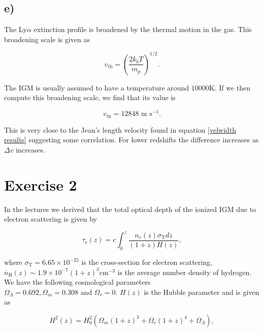 \documentclass[a4paper]{article}
\begin{document}
\subsection*{e)}

The Ly$\alpha$ extinction profile is broadened by the thermal motion in
the gas. This broadening scale is given as 

\begin{equation}\label{eq:broad}
    v_\mathrm{th} = \left(\frac{2 k_b T}{m_p}\right)^{1/2}.
\end{equation}

\noindent The IGM is usually assumed to have a temperature around
$10000$K. If we then compute this broadening scale, we find that its value is

\begin{equation}\label{eq:broad val}
    v_\mathrm{th} = 12848 \textrm{ m s}^{-1}.
\end{equation}

\noindent This is very close to the Jean's length velocity found in
equation \eqref{velwidth results} suggesting some correlation. For lower
redshifts the difference increases as $\Delta v$ increases.

\section*{Exercise 2}
In the lectures we derived that the total optical depth of the ionized IGM due to electron scattering is given by

\begin{equation}\label{eq:tau}
    \tau _ { \mathrm { e } } ( z ) = c \int _ { 0 } ^ { z } \frac { n _ { e } ( z )
    \sigma _ { \mathrm { T } } d z } { ( 1 + z ) H ( z ) },
\end{equation}

\noindent where $\sigma _ { \mathrm { T } } = 6.65 \times 10^{-25}$ is the cross-section
for electron scattering, $\overline { n } _ { \mathrm { H } } ( z ) \sim 1.9 \times 10 ^
{ - 7 } ( 1 + z ) ^ { 3 } \mathrm{cm}^{-3}$ is the average number density of hydrogen.
We have the following cosmological parameters $\Omega _ { \Lambda } = 0.692 , 
\Omega _ { m } = 0.308 \text { and } \Omega _ { r } = 0$. $H(z)$ is the Hubble parameter
and is given as

\begin{equation}\label{eq:hub}
    H ^ { 2 } ( z ) = H _ { 0 } ^ { 2 } \left( \Omega _ { m } ( 1 + z ) ^ { 3 } + \Omega
    _ { r } ( 1 + z ) ^ { 4 } + \Omega _ { \Lambda } \right),
\end{equation}
\end{document}
